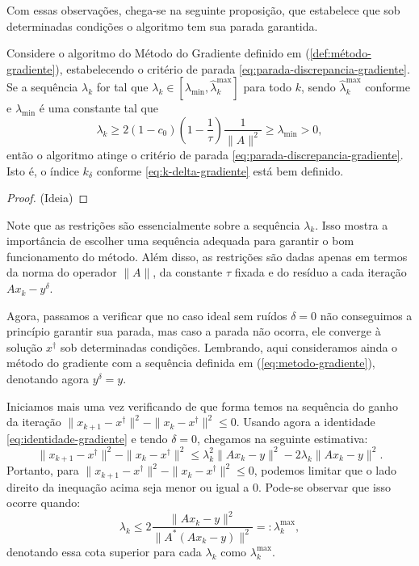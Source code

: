 Com essas observações, chega-se na seguinte proposição, que estabelece que sob determinadas condições o algoritmo tem sua parada garantida.

\begin{prop}
    Considere o algoritmo do Método do Gradiente definido em (\ref{def:método-gradiente}), estabelecendo o critério de parada \eqref{eq:parada-discrepancia-gradiente}. Se a sequência $\lambda_k$ for tal que $\lambda_k \in [\lambda_{\min}, \hat\lambda_k^{\max}]$ para todo $k$, sendo $\hat\lambda_k^{\max}$ conforme e $\lambda_{\min}$ é uma constante tal que 
    \[
        \lambda_k \geq 2 (1-c_0)(1 - \frac 1 \tau) \frac{1}{\|A\|^2} \geq \lambda_{\min}>0,
    \]
    então o algoritmo atinge o critério de parada \eqref{eq:parada-discrepancia-gradiente}. Isto é, o índice $k_\delta$ conforme \eqref{eq:k-delta-gradiente} está bem definido.
\end{prop}
\begin{proof} (Ideia)
\end{proof}

Note que as restrições são essencialmente sobre a sequência $\lambda_k$. Isso mostra a importância de escolher uma sequência adequada para garantir o bom funcionamento do método. Além disso, as restrições são dadas apenas em termos da norma do operador $\|A\|$, da constante $\tau$ fixada e do resíduo a cada iteração $Ax_k-y^\delta$.

Agora, passamos a verificar que no caso ideal sem ruídos $\delta=0$ não conseguimos a princípio garantir sua parada, mas caso a parada não ocorra, ele converge à solução $x^\dag$ sob determinadas condições. Lembrando, aqui consideramos ainda o método do gradiente com a sequência definida em (\ref{eq:metodo-gradiente}), denotando agora $y^\delta = y$.

Iniciamos mais uma vez verificando de que forma temos na sequência do ganho da iteração $\|x_{k+1} - x^\dag\|^2-\| x_k - x^\dag\|^2\leq0$. Usando agora a identidade \eqref{eq:identidade-gradiente} e tendo $\delta=0$, chegamos na seguinte estimativa:
\[
\|x_{k+1} - x^\dag\|^2-\| x_k - x^\dag\|^2 \leq \lambda_k^2\|Ax_k - y\|^2 - 2 \lambda_k \| Ax_k - y\|^2.
\]
Portanto, para $\|x_{k+1} - x^\dag\|^2-\| x_k - x^\dag\|^2 \leq 0 $, podemos limitar que o lado direito da inequação acima seja menor ou igual a 0. Pode-se observar que isso ocorre quando:
\begin{equation}
    \lambda_k \leq 2 \frac{ \| Ax_k - y\|^2}{\|A^*(Ax_k - y)\|^2} =: \lambda_k^{\max},
\end{equation}
denotando essa cota superior para cada $\lambda_k$ como $\lambda_k^{\max}$.

